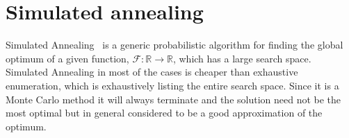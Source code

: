 \section{Simulated annealing}
\label{sec:simulated-annealing}

Simulated Annealing~\cite{skir83} is a generic probabilistic algorithm
for finding the global optimum of a given function,
$\mathcal{F}: \mathbb{R} \rightarrow \mathbb{R}$, which has a large
search space.  Simulated Annealing in most of the cases is cheaper than
exhaustive enumeration, which is exhaustively listing the entire search
space. Since it is a Monte Carlo method it will always terminate and the
solution need not be the most optimal but in general considered to be a
good approximation of the optimum.






